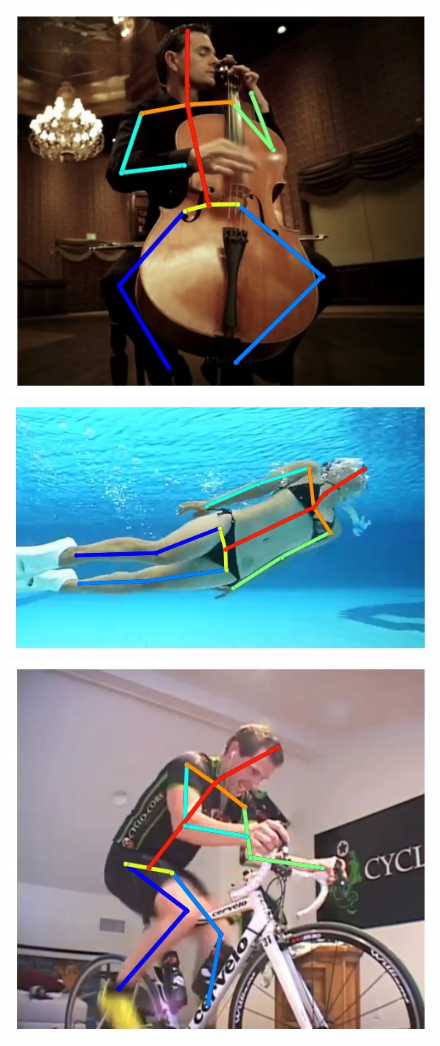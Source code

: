 \begin{figure}[t!]
    \includegraphics[height=\flowh]{Figures/pose/qualitative/pred-7}
    \\
    \includegraphics[height=\flowh]{Figures/pose/qualitative/pred-8}
    \hfill
    \includegraphics[height=\flowh]{Figures/pose/qualitative/pred-9}

\end{figure}
